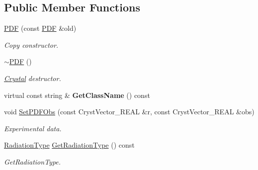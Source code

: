 \subsection*{Public Member Functions}
\begin{DoxyCompactItemize}
\item 
\mbox{\label{class_obj_cryst_1_1_p_d_f_af5633baa0e58aa65b1a7cf80cfb79712}} 
\mbox{\hyperlink{class_obj_cryst_1_1_p_d_f_af5633baa0e58aa65b1a7cf80cfb79712}{P\+DF}} (const \mbox{\hyperlink{class_obj_cryst_1_1_p_d_f}{P\+DF}} \&old)
\begin{DoxyCompactList}\small\item\em Copy constructor. \end{DoxyCompactList}\item 
\mbox{\label{class_obj_cryst_1_1_p_d_f_adf8dacf02c0b3a6c8f49d86daa25b527}} 
\mbox{\hyperlink{class_obj_cryst_1_1_p_d_f_adf8dacf02c0b3a6c8f49d86daa25b527}{$\sim$\+P\+DF}} ()
\begin{DoxyCompactList}\small\item\em \mbox{\hyperlink{class_obj_cryst_1_1_crystal}{Crystal}} destructor. \end{DoxyCompactList}\item 
\mbox{\label{class_obj_cryst_1_1_p_d_f_aa30274587a0c72de2841235c48363bb4}} 
virtual const string \& {\bfseries Get\+Class\+Name} () const
\item 
\mbox{\label{class_obj_cryst_1_1_p_d_f_a7ff4d297dca6974e099ad5b45d6b9ffa}} 
void \mbox{\hyperlink{class_obj_cryst_1_1_p_d_f_a7ff4d297dca6974e099ad5b45d6b9ffa}{Set\+P\+D\+F\+Obs}} (const Cryst\+Vector\+\_\+\+R\+E\+AL \&r, const Cryst\+Vector\+\_\+\+R\+E\+AL \&obs)
\begin{DoxyCompactList}\small\item\em Experimental data. \end{DoxyCompactList}\item 
\mbox{\label{class_obj_cryst_1_1_p_d_f_a2a8e72f182ce9e9a64ee7b7734d63808}} 
\mbox{\hyperlink{namespace_obj_cryst_a48fe50a094c607f8897378934d3d73ef}{Radiation\+Type}} \mbox{\hyperlink{class_obj_cryst_1_1_p_d_f_a2a8e72f182ce9e9a64ee7b7734d63808}{Get\+Radiation\+Type}} () const
\begin{DoxyCompactList}\small\item\em Get\+Radiation\+Type. \end{DoxyCompactList}\item 

\end{DoxyCompactItemize}
